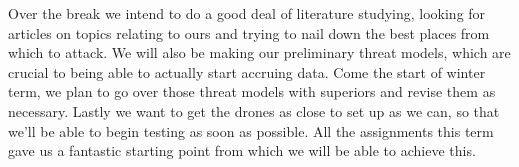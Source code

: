 \documentclass[IEEEtran,letterpaper,10pt,notitlepage,draftclsnofoot,onecolumn]{article}
\begin{document}
Over the break we intend to do a good deal of literature studying, looking for articles on topics relating to ours and trying to nail down the best places from which to attack. 
We will also be making our preliminary threat models, which are crucial to being able to actually start accruing data.
Come the start of winter term, we plan to go over those threat models with superiors and revise them as necessary.
Lastly we want to get the drones as close to set up as we can, so that we'll be able to begin testing as soon as possible. 
All the assignments this term gave us a fantastic starting point from which we will be able to achieve this.




\end{document}
